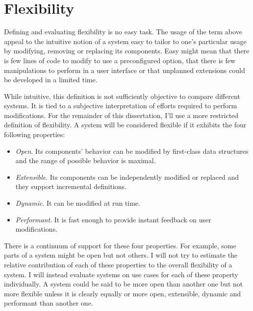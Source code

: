 
\section{Flexibility}

Defining and evaluating flexibility is no easy task. The usage of the term
above appeal to the intuitive notion of a system easy to tailor to one's
particular usage by modifying, removing or replacing its components. Easy might
mean that there is few lines of code to modify to use a preconfigured option,
that there is few manipulations to perform in a user interface or that unplanned
extensions could be developed in a limited time.

While intuitive, this definition is not sufficiently objective to compare
different systems. It is tied to a subjective interpretation of efforts required to
perform modifications. For the remainder of this dissertation, I'll use a more
restricted definition of flexibility. A system will be considered flexible if
it exhibits the four following properties:

\begin{itemize}
    \item \textit{Open}. Its components' behavior can be modified by
        first-class data structures and the range of possible behavior is
        maximal. 

    \item \textit{Extensible}. Its components can be independently modified or
        replaced and they support incremental definitions. 

    \item \textit{Dynamic}. It can be modified at run time.

    \item \textit{Performant}. It is fast enough to provide instant feedback on
        user modifications.
\end{itemize}

There is a continuum of support for these four properties. For example, some
parts of a system might be open but not others.  I will not try to estimate the
relative contribution of each of these properties to the overall flexibility of
a system. I will instead evaluate systems on use cases for each of these
property individually. A system could be said to be more open than another one
but not more flexible unless it is clearly equally or more open, extensible,
dynamic and performant than another one.

